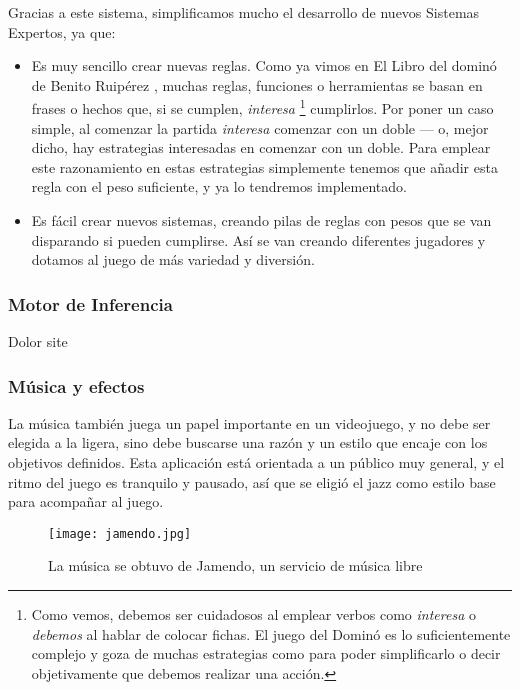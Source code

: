 Gracias a este sistema, simplificamos mucho el desarrollo de nuevos Sistemas Expertos, ya que:
\begin{itemize}
    \item Es muy sencillo crear nuevas reglas. Como ya vimos en El Libro del dominó de Benito Ruipérez \cite{mora90},
        muchas reglas, funciones o herramientas se basan en frases o hechos que, si se cumplen, \emph{interesa}
        \footnote{Como vemos, debemos ser cuidadosos al emplear verbos como \emph{interesa} o \emph{debemos} al hablar
        de colocar fichas. El juego del Dominó es lo suficientemente complejo y goza de muchas estrategias como para poder
        simplificarlo o decir objetivamente que debemos realizar una acción.} cumplirlos.
        Por poner un caso simple, al comenzar la partida \emph{interesa} comenzar con un doble --- o, mejor dicho, hay
        estrategias interesadas en comenzar con un doble. Para emplear este razonamiento en estas estrategias simplemente
        tenemos que añadir esta regla con el peso suficiente, y ya lo tendremos implementado.
    \item Es fácil crear nuevos sistemas, creando pilas de reglas con pesos que se van disparando si pueden cumplirse.
        Así se van creando diferentes jugadores y dotamos al juego de más variedad y diversión.
\end{itemize}

\subsubsection{Motor de Inferencia}


Dolor site

\subsubsection{Música y efectos}


La música también juega un papel importante en un videojuego, y no debe ser elegida a la ligera, sino
        debe buscarse una razón y un estilo que encaje con los objetivos definidos. Esta aplicación está orientada a un
        público muy general, y el ritmo del juego es tranquilo y pausado, así que se eligió el jazz como estilo base
        para acompañar al juego.

\begin{figure}[h]
  \label{jamendo}
  \begin{center}
    \texttt{[image: jamendo.jpg]}
  \end{center}
  \caption{La música se obtuvo de Jamendo, un servicio de música libre}
\end{figure}

